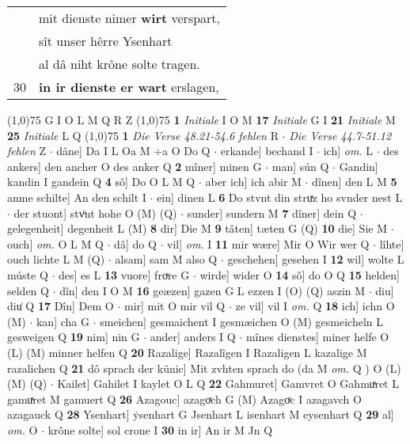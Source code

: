\documentclass[8pt,a4paper,notitlepage]{article}
\begin{document}
\begin{table}[ht]
\begin{minipage}[t]{0.5\linewidth}
\begin{tabular}{rl}
 & mit dienste nimer \textbf{wirt} verspart,\\ 
 & sît unser hêrre Ysenhart\\ 
 & al dâ niht krône solte tragen.\\ 
30 & \textbf{in ir dienste er wart} erslagen,\\ 
\end{tabular}
\scriptsize
\line(1,0){75} \newline
G I O L M Q R Z \newline
\line(1,0){75} \newline
\textbf{1} \textit{Initiale} I O M  \textbf{17} \textit{Initiale} G I  \textbf{21} \textit{Initiale} M  \textbf{25} \textit{Initiale} L Q  \newline
\line(1,0){75} \newline
\textbf{1} \textit{Die Verse 48.21-54.6 fehlen} R   $\cdot$ \textit{Die Verse 44.7-51.12 fehlen} Z   $\cdot$ dâne] Da I L Oa M ÷a O Do Q  $\cdot$ erkande] bechand I  $\cdot$ ich] \textit{om.} L  $\cdot$ des ankers] den ancher O des anker Q \textbf{2} mîner] minen G  $\cdot$ man] sún Q  $\cdot$ Gandin] kandin I gandein Q \textbf{4} sô] Do O L M Q  $\cdot$ aber ich] ich abir M  $\cdot$ dînen] den L M \textbf{5} anme schilte] An den schilt I  $\cdot$ ein] dinen L \textbf{6} Do stvnt din struͯz ho svnder nest L  $\cdot$ der stuont] stvͦnt hohe O (M) (Q)  $\cdot$ sunder] sundern M \textbf{7} dîner] dein Q  $\cdot$ gelegenheit] degenheit L (M) \textbf{8} dir] Die M \textbf{9} tâten] tæten G (Q) \textbf{10} die] Sie M  $\cdot$ ouch] \textit{om.} O L M Q  $\cdot$ dâ] do Q  $\cdot$ vil] \textit{om.} I \textbf{11} mir wære] Mir O Wir wer Q  $\cdot$ lîhte] ouch lichte L M (Q)  $\cdot$ alsam] sam M also Q  $\cdot$ geschehen] gesehen I \textbf{12} wil] wolte L múste Q  $\cdot$ des] es L \textbf{13} vuore] froͮre G  $\cdot$ wirde] wider O \textbf{14} sô] do O Q \textbf{15} helden] selden Q  $\cdot$ dîn] den I O M \textbf{16} geæzen] gazen G L ezzen I (O) (Q) aszin M  $\cdot$ diu] diu͑ Q \textbf{17} Dîn] Dem O  $\cdot$ mir] mit O mir vil Q  $\cdot$ ze vil] vil I \textit{om.} Q \textbf{18} ich] ichn O (M)  $\cdot$ kan] cha G  $\cdot$ smeichen] gesmaichent I gesmæichen O (M) gesmeicheln L gesweigen Q \textbf{19} nim] nin G  $\cdot$ ander] anders I Q  $\cdot$ mînes dienstes] miner helfe O (L) (M) minner helfen Q \textbf{20} Razalige] Razalîgen I Razaligen L kazalige M razalichen Q \textbf{21} dô sprach der künic] Mit zvhten sprach do (da M \textit{om.} Q ) O (L) (M) (Q)  $\cdot$ Kailet] Gahilet I kaylet O L Q \textbf{22} Gahmuret] Gamvret O Gahmuͯret L gamuͯret M gamuert Q \textbf{26} Azagouc] azagoͮch G (M) Azagoͮc I azagavch O azagauck Q \textbf{28} Ysenhart] ẏsenhart G Jsenhart L isenhart M eysenhart Q \textbf{29} al] \textit{om.} O  $\cdot$ krône solte] sol crone I \textbf{30} in ir] An ir M Jn Q \newline

\end{minipage}
\end{table}
\end{document}
